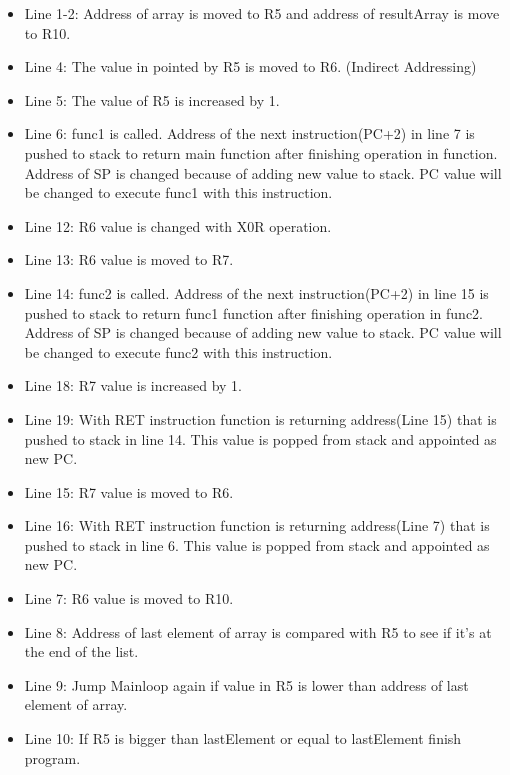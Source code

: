 \documentclass[pdftex,12pt,a4paper]{article}
\begin{document}
\begin{itemize}
    \item Line 1-2: Address of array is moved to R5 and address of resultArray is move to R10.

    \item Line 4:  The value in pointed by R5 is moved to R6. (Indirect Addressing)

    \item Line 5: The value of R5 is increased by 1.

    \item Line 6: func1 is called. Address of the next instruction(PC+2) in line 7 is pushed to stack to return main function after finishing operation in function. Address of SP is changed because of adding new value to stack. PC value will be changed to execute func1 with this instruction.
    
    \item Line 12: R6 value is changed with X0R operation.

    \item Line 13: R6 value is moved to R7.
    
    \item Line 14: func2 is called. Address of the next instruction(PC+2) in line 15 is pushed to stack to return func1 function after finishing operation in func2. Address of SP is changed because of adding new value to stack. PC value will be changed to execute func2 with this instruction.
    
    \item Line 18: R7 value is increased by 1.

    \item Line 19: With RET instruction function is returning address(Line 15) that is pushed to stack in line 14. This value is popped from stack and appointed as new PC.
    
    \item Line 15: R7 value is moved to R6.
    
    \item Line 16: With RET instruction function is returning address(Line 7) that is pushed to stack in line 6. This value is popped from stack and appointed as new PC.
    
    \item Line 7: R6 value is moved to R10.
    
    \item Line 8: Address of last element of array is compared with R5 to see if it's at the end of the list.

    \item Line 9: Jump Mainloop again if value in R5 is lower than address of last element of array.
    
    \item Line 10: If R5 is bigger than lastElement or equal to lastElement finish program.
\end{itemize}{}
\end{document}
